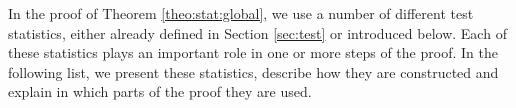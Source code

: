 In the proof of Theorem \ref{theo:stat:global}, we use a number of different test statistics, either already defined in Section \ref{sec:test} or introduced below. Each of these statistics plays an important role in one or more steps of the proof. In the following list, we present these statistics, describe how they are constructed and explain in which parts of the proof they are used. %
